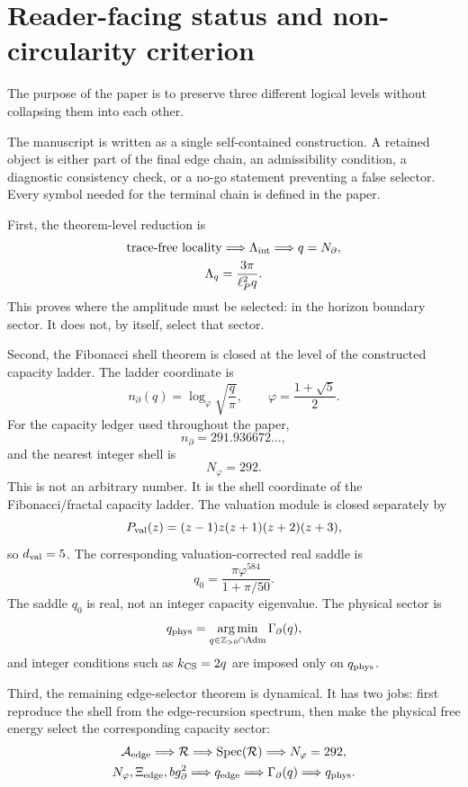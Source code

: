 \documentclass[aps,prd,reprint,nofootinbib,superscriptaddress,floatfix]{revtex4-2}
\numberwithin{equation}{section}
\theoremstyle{definition}
\theoremstyle{plain}
\begin{document}
\maketitle


\section{Reader-facing status and non-circularity criterion}
\label{sec:reader-status}

The purpose of the paper is to preserve three different logical levels without
collapsing them into each other.

The manuscript is written as a single self-contained construction.  A retained
object is either part of the final edge chain, an admissibility condition, a
diagnostic consistency check, or a no-go statement preventing a false selector.
Every symbol needed for the terminal chain is defined in the paper.

First, the theorem-level reduction is
\[
\begin{gathered}
\text{trace-free locality}
\Longrightarrow
\Lambda_{\rm int}
\Longrightarrow
q=N_\partial,\\
\Lambda_q=\frac{3\pi}{\ell_P^2 q}.
\end{gathered}
\]
This proves where the amplitude must be selected: in the horizon boundary
sector.  It does not, by itself, select that sector.

Second, the Fibonacci shell theorem is closed at the level of the constructed
capacity ladder.  The ladder coordinate is
\[
n_\partial(q)=\log_\varphi\sqrt{\frac{q}{\pi}},
\qquad
\varphi=\frac{1+\sqrt5}{2}.
\]
For the capacity ledger used throughout the paper,
\[
n_\partial=291.936672\ldots,
\]
and the nearest integer shell is
\[
\boxed{N_\varphi=292.}
\]
This is not an arbitrary number.  It is the shell coordinate of the
Fibonacci/fractal capacity ladder.  The valuation module is closed separately by
\[
P_{\rm val}(z)=(z-1)z(z+1)(z+2)(z+3),
\]
so \(d_{\rm val}=5\).  The corresponding valuation-corrected real saddle is
\[
\boxed{
q_0=\frac{\pi\varphi^{584}}{1+\pi/50}.
}
\]
The saddle \(q_0\) is real, not an integer capacity eigenvalue.  The physical
sector is
\[
q_{\rm phys}=
\operatorname*{arg\,min}_{q\in\mathbb Z_{>0}\cap{\rm Adm}}
\Gamma_\partial(q),
\]
and integer conditions such as \(k_{\rm CS}=2q\) are imposed only on
\(q_{\rm phys}\).

Third, the remaining edge-selector theorem is dynamical.  It has two jobs:
first reproduce the shell from the edge-recursion spectrum, then make the
physical free energy select the corresponding capacity sector:
\[
\begin{gathered}
\mathcal A_{\rm edge}
\Longrightarrow
\mathcal R
\Longrightarrow
\operatorname{Spec}(\mathcal R)
\Longrightarrow
N_\varphi=292,\\
N_\varphi,\Xi_{\rm edge},b g_\partial^2
\Longrightarrow
q_{\rm edge}
\Longrightarrow
\Gamma_\partial(q)
\Longrightarrow
q_{\rm phys}.
\end{gathered}
\]
\end{document}
